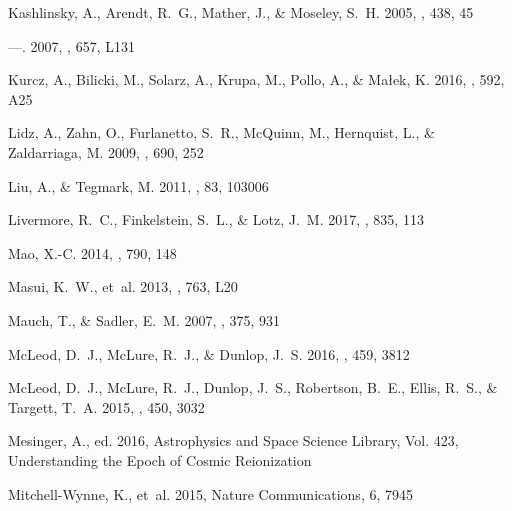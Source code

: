 \documentclass[numberedappendix]{emulateapj}
\begin{document}
\begin{thebibliography}{124}
{Kashlinsky}, A., {Arendt}, R.~G., {Mather}, J., \& {Moseley}, S.~H. 2005,
  \nat, 438, 45

---. 2007, \apjl, 657, L131

{Kurcz}, A., {Bilicki}, M., {Solarz}, A., {Krupa}, M., {Pollo}, A., \&
  {Ma{\l}ek}, K. 2016, \aap, 592, A25

{Lidz}, A., {Zahn}, O., {Furlanetto}, S.~R., {McQuinn}, M., {Hernquist}, L., \&
  {Zaldarriaga}, M. 2009, \apj, 690, 252

{Liu}, A., \& {Tegmark}, M. 2011, \prd, 83, 103006

{Livermore}, R.~C., {Finkelstein}, S.~L., \& {Lotz}, J.~M. 2017, \apj, 835, 113

{Mao}, X.-C. 2014, \apj, 790, 148

{Masui}, K.~W., {et~al.} 2013, \apjl, 763, L20

{Mauch}, T., \& {Sadler}, E.~M. 2007, \mnras, 375, 931

{McLeod}, D.~J., {McLure}, R.~J., \& {Dunlop}, J.~S. 2016, \mnras, 459, 3812

{McLeod}, D.~J., {McLure}, R.~J., {Dunlop}, J.~S., {Robertson}, B.~E., {Ellis},
  R.~S., \& {Targett}, T.~A. 2015, \mnras, 450, 3032

{Mesinger}, A., ed. 2016, Astrophysics and Space Science Library, Vol. 423,
  {Understanding the Epoch of Cosmic Reionization}

{Mitchell-Wynne}, K., {et~al.} 2015, Nature Communications, 6, 7945


\end{thebibliography}
\end{document}
